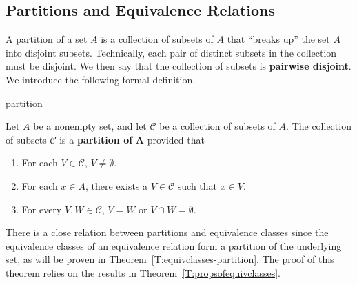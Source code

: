 \subsection*{Partitions and Equivalence Relations}
A partition of a set  $A$  is a collection of subsets of  $A$  that ``breaks up'' the set  $A$  into disjoint subsets.  Technically, each pair of distinct subsets in the collection must be disjoint.  We then say that the collection of subsets is \textbf{pairwise disjoint}.
%
%
  We introduce the following formal definition.

\begin{defbox}{partition}{Let  $A$  be a nonempty set, and let  $\mathcal{C}$   be a collection of subsets of  $A$.  
The collection of subsets $\mathcal{C}$  is a \textbf{partition of}
%
  $\boldsymbol{A}$  provided that

\begin{enumerate}
\item For each  $V \in \mathcal{C}$,  $V \ne \emptyset $. 

\item For each  $x \in A$, there exists a  $V \in \mathcal{C}$ such that  $x \in V$\!.

\item For every  $V, W \in \mathcal{C}$,  $V = W$ or $V \cap W = \emptyset $.
\end{enumerate}}
\end{defbox}

There is a close relation between partitions and equivalence classes since the equivalence classes of an equivalence relation form a partition of the underlying set, as will be proven in Theorem~\ref{T:equivclasses-partition}.  The proof of this theorem relies on the results in Theorem~\ref{T:propsofequivclasses}.

